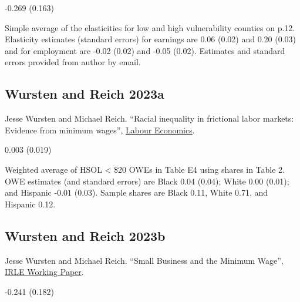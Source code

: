 \vspace{0.7em}

 -0.269 (0.163)

\vspace{0.7em}

 Simple average of the elasticities for low and high vulnerability counties on p.12. Elasticity estimates (standard errors) for earnings are 0.06 (0.02) and 0.20 (0.03) and for employment are -0.02 (0.02) and -0.05 (0.02). Estimates and standard errors provided from author by email.

\subsection*{Wursten and Reich 2023a}
\vspace{-0.7em}

\noindent Jesse Wursten and Michael Reich. ``Racial inequality in frictional labor markets: Evidence from minimum wages'', \href{https://doi.org/10.1016/j.labeco.2023.102344}{Labour Economics}.

\vspace{0.7em}

 0.003 (0.019)

\vspace{0.7em}

 Weighted average of HSOL < \$20 OWEs in Table E4 using shares in Table 2. OWE estimates (and standard errors) are Black 0.04 (0.04); White 0.00 (0.01); and Hispanic -0.01 (0.03). Sample shares are Black 0.11, White 0.71, and Hispanic 0.12.

\subsection*{Wursten and Reich 2023b}
\vspace{-0.7em}

\noindent Jesse Wursten and Michael Reich. ``Small Business and the Minimum Wage'', \href{https://irle.berkeley.edu/wp-content/uploads/2023/03/Small-Businesses-and-the-Minimum-Wage-3-14-23.pdf}{IRLE Working Paper}.

\vspace{0.7em}

 -0.241 (0.182)

\vspace{0.7em}

